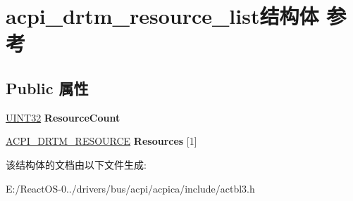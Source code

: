 \hypertarget{structacpi__drtm__resource__list}{}\section{acpi\+\_\+drtm\+\_\+resource\+\_\+list结构体 参考}
\label{structacpi__drtm__resource__list}
\subsection*{Public 属性}
\begin{DoxyCompactItemize}
\item 
\mbox{\label{structacpi__drtm__resource__list_a40bf23117c985deb1069c7560e023e7b}} 
\hyperlink{_processor_bind_8h_ae1e6edbbc26d6fbc71a90190d0266018}{U\+I\+N\+T32} {\bfseries Resource\+Count}
\item 
\mbox{\label{structacpi__drtm__resource__list_ab2f35c977782f573e97725fe64c09dd0}} 
\hyperlink{structacpi__drtm__resource}{A\+C\+P\+I\+\_\+\+D\+R\+T\+M\+\_\+\+R\+E\+S\+O\+U\+R\+CE} {\bfseries Resources} \mbox{[}1\mbox{]}
\end{DoxyCompactItemize}


该结构体的文档由以下文件生成\+:\begin{DoxyCompactItemize}
\item 
E\+:/\+React\+O\+S-\/0../drivers/bus/acpi/acpica/include/actbl3.\+h\end{DoxyCompactItemize}
